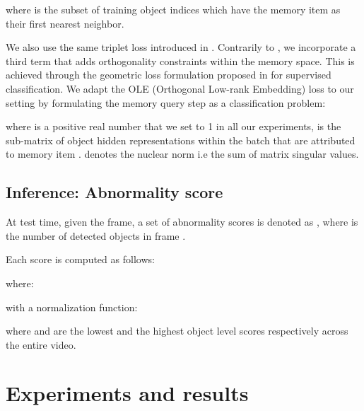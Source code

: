 \documentclass{article}
\begin{document}
where  is the subset of training object indices which have the memory item  as their first nearest neighbor.



We also use the same triplet loss  introduced in \cite{mnad}. Contrarily to \cite{mnad}, we incorporate a third term  that adds orthogonality constraints within the memory space. This is achieved through the geometric loss formulation proposed in \cite{ole_Lezama2018} for supervised classification. We adapt the OLE (Orthogonal Low-rank Embedding) loss to our setting by formulating the memory query step as a classification problem: 


where  is a positive real number that we set to 1 in all our experiments,  is the sub-matrix of object hidden representations within the batch that are attributed to memory item .
 denotes the nuclear norm i.e the sum of matrix singular values. 


\subsection{Inference: Abnormality score} \label{subsec:abn_sco}

At test time, given the  frame, a set of abnormality scores is denoted as , where  is the number of detected objects in frame . 

Each score  is computed as follows: 

where:

 

 
 


with  a normalization function:



where  and  are the lowest and the highest object level scores respectively across the entire video.




\section{Experiments and results}
\label{sec:format}
\end{document}
